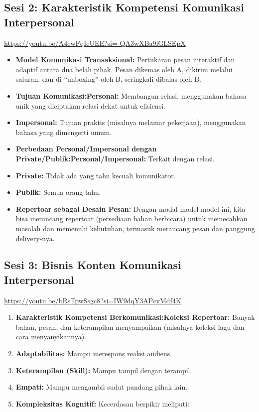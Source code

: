 \documentclass[
  letterpaper,
  DIV=11,
  numbers=noendperiod]{scrreprt}
\providecommand{\tightlist}{%
  \setlength{\itemsep}{0pt}\setlength{\parskip}{0pt}}
\begin{document}
\subsection{Sesi 2: Karakteristik Kompetensi Komunikasi
Interpersonal}\label{sesi-2-karakteristik-kompetensi-komunikasi-interpersonal}

\url{https://youtu.be/A4ewFqIeUEE?si=-QA3wXBa9lGLSEpX}

\begin{itemize}
\tightlist
\item
  \textbf{Model Komunikasi Transaksional:} Pertukaran pesan interaktif
  dan adaptif antara dua belah pihak. Pesan dikemas oleh A, dikirim
  melalui saluran, dan di-``unboxing'' oleh B, seringkali dibalas oleh
  B.
\item
  \textbf{Tujuan Komunikasi:Personal:} Membangun relasi, menggunakan
  bahasa unik yang diciptakan relasi dekat untuk efisiensi.
\item
  \textbf{Impersonal:} Tujuan praktis (misalnya melamar pekerjaan),
  menggunakan bahasa yang dimengerti umum.
\item
  \textbf{Perbedaan Personal/Impersonal dengan
  Private/Publik:Personal/Impersonal:} Terkait dengan relasi.
\item
  \textbf{Private:} Tidak ada yang tahu kecuali komunikator.
\item
  \textbf{Publik:} Semua orang tahu.
\item
  \textbf{Repertoar sebagai Desain Pesan:} Dengan modal model-model ini,
  kita bisa merancang repertoar (persediaan bahan berbicara) untuk
  memecahkan masalah dan memenuhi kebutuhan, termasuk merancang pesan
  dan panggung delivery-nya.
\end{itemize}

\subsection{Sesi 3: Bisnis Konten Komunikasi
Interpersonal}\label{sesi-3-bisnis-konten-komunikasi-interpersonal}

\url{https://youtu.be/bRsTpwSsgc8?si=IW9dqY3APcyMdf4K}

\begin{enumerate}
\def\labelenumi{\arabic{enumi}.}
\tightlist
\item
  \textbf{Karakteristik Kompetensi Berkomunikasi:Koleksi Repertoar:}
  Banyak bahan, pesan, dan keterampilan menyampaikan (misalnya koleksi
  lagu dan cara menyanyikannya).
\item
  \textbf{Adaptabilitas:} Mampu merespons reaksi audiens.
\item
  \textbf{Keterampilan (Skill):} Mampu tampil dengan terampil.
\item
  \textbf{Empati:} Mampu mengambil sudut pandang pihak lain.
\item
  \textbf{Kompleksitas Kognitif:} Kecerdasan berpikir meliputi:
\end{enumerate}
\end{document}
